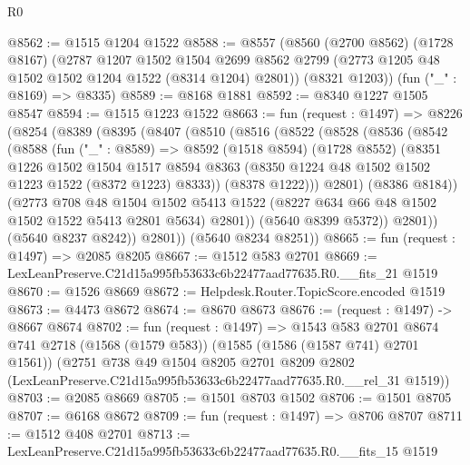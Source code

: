 \begin{lexlean}{R0}
\begin{coremodule}
@8562 := @1515 @1204 @1522
@8588 := @8557
    (@8560
      (@2700 @8562)
      (@1728 @8167)
      (@2787
        @1207
        @1502
        @1504
        @2699
        @8562
        @2799
        (@2773 @1205 @48 @1502 @1502 @1204 @1522 (@8314 @1204) @2801))
      (@8321 @1203))
    (fun ("_" : @8169) => @8335)
@8589 := @8168 @1881
@8592 := @8340 @1227 @1505 @8547
@8594 := @1515 @1223 @1522
@8663 := fun (request : @1497) =>
  @8226
    (@8254
      (@8389
        (@8395
          (@8407
            (@8510
              (@8516
                (@8522
                  (@8528
                    (@8536
                      (@8542
                        (@8588
                          (fun ("_" : @8589) =>
                          @8592
                            (@1518 @8594)
                            (@1728 @8552)
                            (@8351
                              @1226
                              @1502
                              @1504
                              @1517
                              @8594
                              @8363
                              (@8350 @1224 @48 @1502 @1502 @1223 @1522 (@8372 @1223) @8333))
                            (@8378 @1222)))
                        @2801)
                      (@8386 @8184))
                    (@2773
                      @708
                      @48
                      @1504
                      @1502
                      @5413
                      @1522
                      (@8227 @634 @66 @48 @1502 @1502 @1522 @5413 @2801 @5634)
                      @2801))
                  (@5640 @8399 @5372))
                @2801))
            (@5640 @8237 @8242))
          @2801))
      (@5640 @8234 @8251))
@8665 := fun (request : @1497) => @2085 @8205
@8667 := @1512 @583 @2701
@8669 := LexLeanPreserve.C21d15a995fb53633c6b22477aad77635.R0.__fits_21 @1519
@8670 := @1526 @8669
@8672 := Helpdesk.Router.TopicScore.encoded @1519
@8673 := @4473 @8672
@8674 := @8670 @8673
@8676 := (request : @1497) -> @8667 @8674
@8702 := fun (request : @1497) =>
  @1543
    @583
    @2701
    @8674
    @741
    @2718
    (@1568 (@1579 @583))
    (@1585 (@1586 (@1587 @741) @2701 @1561))
    (@2751
      @738
      @49
      @1504
      @8205
      @2701
      @8209
      @2802
      (LexLeanPreserve.C21d15a995fb53633c6b22477aad77635.R0.__rel_31 @1519))
@8703 := @2085 @8669
@8705 := @1501 @8703 @1502
@8706 := @1501 @8705
@8707 := @6168 @8672
@8709 := fun (request : @1497) => @8706 @8707
@8711 := @1512 @408 @2701
@8713 := LexLeanPreserve.C21d15a995fb53633c6b22477aad77635.R0.__fits_15 @1519

\end{coremodule}
\end{lexlean}
